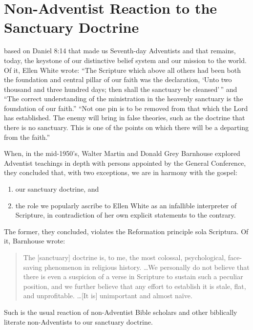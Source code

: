 \chapter{Non-Adventist Reaction to the Sanctuary Doctrine}
\label{ch:non-sda}

 based on Daniel 8:14 that made us Seventh-day
Adventists and that remains, today, the keystone of our distinctive belief
system and our mission to the world. Of it, Ellen White wrote: ``The
Scripture which above all others had been both the foundation and central 
pillar of our faith was the declaration, `Unto two thousand and three
hundred days; then shall the sanctuary be cleansed'\,''\cite{8} and ``The correct
understanding of the ministration in the heavenly sanctuary is the
foundation of our faith.'' ``Not one pin is to be removed from that which the
Lord has established. The enemy will bring in false theories, such as the
doctrine that there is no sanctuary. This is one of the points on which
there will be a departing from the faith.''\cite{31}

When, in the mid-1950's, Walter Martin and Donald Grey Barnhouse explored
Adventist teachings in depth with persons appointed by the General
Conference, they concluded that, with two exceptions, we are in harmony with
the gospel:
\begin{enumerate}
    \item our sanctuary doctrine, and 
    \item the role we popularly
ascribe to Ellen White as an infallible interpreter of Scripture, in
contradiction of her own explicit statements to the contrary.
\end{enumerate}
The former,
they concluded, violates the Reformation principle sola
Scriptura. Of it, Barnhouse wrote: 
\begin{quote}
The [sanctuary] doctrine is, to me, the most colossal,
psychological, face-saving phenomenon in religious history. \ldots We
personally do not believe that there is even a suspicion of a verse in
Scripture to sustain such a peculiar position, and we further believe that
any effort to establish it is stale, flat, and unprofitable. \ldots [It is]
unimportant and almost naïve.\cite{33} 
\end{quote}

\newpage
Such is the usual reaction of non-Adventist Bible scholars and other
biblically literate non-Adventists to our sanctuary doctrine.
